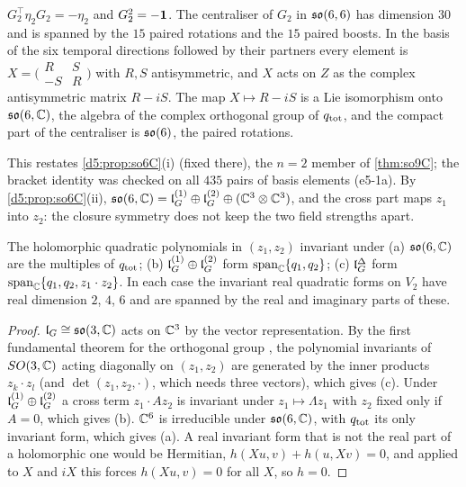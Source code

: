 \begin{proposition}
\label{e5:prop:so6C}
$G_2^{\!\top}\eta_2G_2=-\eta_2$ and $G_2^2=-\mathbf 1$. The centraliser of $G_2$ in $\mathfrak{so}(6,6)$ has dimension $30$ and is spanned by the $15$ paired
rotations and the $15$ paired boosts. In the basis of the six temporal directions followed by their partners every element is
$X=\bigl(\begin{smallmatrix}R&S\\-S&R\end{smallmatrix}\bigr)$ with $R,S$ antisymmetric, and $X$ acts on $Z$ as the complex antisymmetric matrix
$R-iS$. The map $X\mapsto R-iS$ is a Lie isomorphism onto $\mathfrak{so}(6,\mathbb{C})$, the algebra of the complex orthogonal group of $q_{\rm tot}$, and the
compact part of the centraliser is $\mathfrak{so}(6)$, the paired rotations.
\end{proposition}

This restates \cref{d5:prop:so6C}(i) (fixed there), the $n=2$ member of \cref{thm:so9C}; the bracket identity was checked
on all $435$ pairs of basis elements (e5-1a). By \cref{d5:prop:so6C}(ii), $\mathfrak{so}(6,\mathbb{C})=\mathfrak l_G^{(1)}\oplus\mathfrak l_G^{(2)}\oplus(\mathbb{C}^3\otimes\mathbb{C}^3)$,
and the cross part maps $z_1$ into $z_2$: the closure symmetry does not keep the two field strengths apart.

\begin{proposition}
\label{e5:prop:quad}
The holomorphic quadratic polynomials in $(z_1,z_2)$ invariant under
(a) $\mathfrak{so}(6,\mathbb{C})$ are the multiples of $q_{\rm tot}$;
(b) $\mathfrak l_G^{(1)}\oplus\mathfrak l_G^{(2)}$ form $\operatorname{span}_{\mathbb{C}}\{q_1,q_2\}$;
(c) $\mathfrak l_G^\Delta$ form $\operatorname{span}_{\mathbb{C}}\{q_1,q_2,z_1\cdot z_2\}$.
In each case the invariant real quadratic forms on $V_2$ have real dimension $2$, $4$, $6$ and are spanned by the real and imaginary parts of these.
\end{proposition}

\begin{proof}
$\mathfrak l_G\cong\mathfrak{so}(3,\mathbb{C})$ acts on $\mathbb{C}^3$ by the vector representation. By the first fundamental theorem for the orthogonal group \cite{Weyl39},
the polynomial invariants of $SO(3,\mathbb{C})$ acting diagonally on $(z_1,z_2)$ are generated by the inner products $z_k\cdot z_l$ (and
$\det(z_1,z_2,\cdot)$, which needs three vectors), which gives (c). Under $\mathfrak l_G^{(1)}\oplus\mathfrak l_G^{(2)}$ a cross term $z_1\cdot Az_2$ is invariant
under $z_1\mapsto\Lambda z_1$ with $z_2$ fixed only if $A=0$, which gives (b). $\mathbb{C}^6$ is irreducible under $\mathfrak{so}(6,\mathbb{C})$, with $q_{\rm tot}$ its
only invariant form, which gives (a). A real invariant form that is not the real part of a holomorphic one would be Hermitian, $h(Xu,v)+h(u,Xv)=0$,
and applied to $X$ and $iX$ this forces $h(Xu,v)=0$ for all $X$, so $h=0$.
\end{proof}

